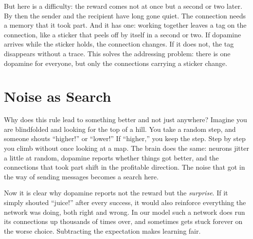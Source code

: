 But here is a difficulty: the reward comes not at once but a second or two later. By then the sender and the recipient have long gone quiet. The connection needs a memory that it took part. And it has one: working together leaves a tag on the connection, like a sticker that peels off by itself in a second or two. If dopamine arrives while the sticker holds, the connection changes. If it does not, the tag disappears without a trace. This solves the addressing problem: there is one dopamine for everyone, but only the connections carrying a sticker change.


\section*{Noise as Search}

Why does this rule lead to something better and not just anywhere? Imagine you are blindfolded and looking for the top of a hill. You take a random step, and someone shouts ``higher!'' or ``lower!'' If ``higher,'' you keep the step. Step by step you climb without once looking at a map. The brain does the same: neurons jitter a little at random, dopamine reports whether things got better, and the connections that took part shift in the profitable direction. The noise that got in the way of sending messages becomes a search here.

Now it is clear why dopamine reports not the reward but the \emph{surprise}. If it simply shouted ``juice!'' after every success, it would also reinforce everything the network was doing, both right and wrong. In our model such a network does run its connections up thousands of times over, and sometimes gets stuck forever on the worse choice. Subtracting the expectation makes learning fair.

